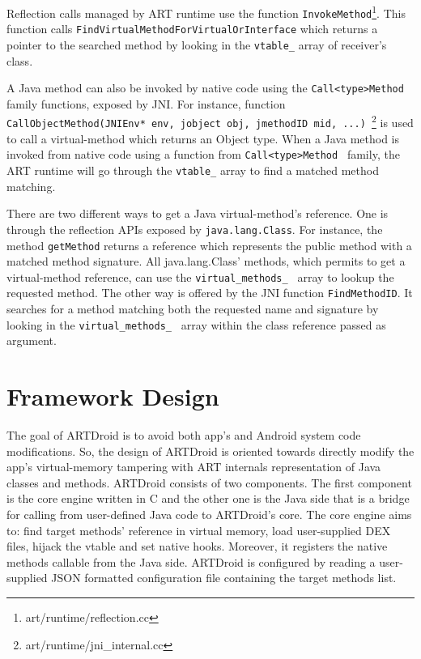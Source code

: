 Reflection calls managed by ART runtime use the function {\tt InvokeMethod}\footnote{art/runtime/reflection.cc}. This function calls {\tt FindVirtualMethodForVirtualOrInterface} which returns a pointer to the searched method by looking in the {\tt vtable\_} array of receiver's class.


A Java method can also be invoked by native code using the {\tt Call<type>Method } family functions, exposed by JNI. 
For instance, function {\tt CallObjectMethod(JNIEnv* env, jobject obj, jmethodID mid, ...) }\footnote{art/runtime/jni\_internal.cc} is used to call a virtual-method which returns an Object type. When a Java method is invoked from native code using a function from {\tt Call<type>Method } family, the ART runtime will go through the {\tt vtable\_} array to find a matched method matching.


There are two different ways to get a Java virtual-method's reference. One is through the reflection APIs exposed by {\tt java.lang.Class}. For instance, the method {\tt getMethod} returns a reference which represents the public method with a matched method signature. All java.lang.Class' methods, which permits to get a virtual-method reference, can use the {\tt virtual\_methods\_ } array to lookup the requested method. The other way is offered by the JNI function {\tt FindMethodID}. It searches for a method matching both the requested name and signature by looking in the {\tt virtual\_methods\_ } array within the class reference passed as argument.


\section{Framework Design}
\label{sec:artdroid}

The goal of ARTDroid is to avoid both app's and Android system code modifications. So, the design of ARTDroid is oriented towards directly modify the app's virtual-memory tampering with ART internals representation of Java classes and methods.
ARTDroid consists of two components. The first component is the core engine written in C and the other one is the Java side that is a bridge for calling from user-defined Java code to ARTDroid's core. The core engine aims to: find target methods' reference in virtual memory, load user-supplied DEX files, hijack the vtable and set native hooks. Moreover, it registers the native methods callable from the Java side. ARTDroid is configured by reading a user-supplied JSON formatted configuration file containing the target methods list.


